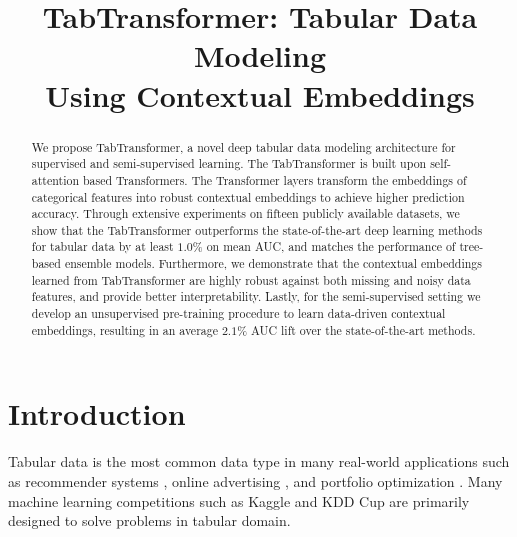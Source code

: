 \title{TabTransformer: Tabular Data Modeling \\ Using Contextual Embeddings}



\maketitle

\begin{abstract}
We propose TabTransformer, a novel deep tabular data modeling architecture for supervised and semi-supervised learning. The TabTransformer is built upon self-attention based Transformers.
The Transformer layers transform the embeddings of categorical features into robust contextual embeddings to achieve higher prediction accuracy.
Through extensive experiments on fifteen publicly available datasets,
we show that 
the TabTransformer outperforms the
state-of-the-art deep learning methods for tabular data
by at least $1.0\%$ on mean AUC, and matches the performance of tree-based ensemble models.
Furthermore, 
we demonstrate that the contextual embeddings learned from TabTransformer are highly robust against both missing and noisy data features, and provide better interpretability.
Lastly, for the semi-supervised setting we develop an unsupervised pre-training procedure to learn data-driven contextual embeddings, resulting in an average $2.1\%$ AUC lift over the state-of-the-art methods.%
\end{abstract}

\section{Introduction}
Tabular data is the most common data type in many real-world applications such as recommender systems \citep{cheng2016wide}, online advertising \citep{song_autoint_2019}, and portfolio optimization \citep{ban2018machine}. Many machine learning competitions such as Kaggle and KDD Cup are primarily designed to solve problems in tabular domain. 

